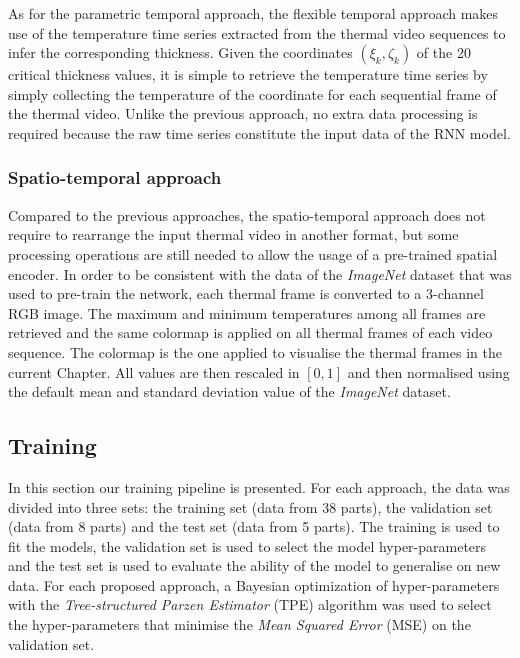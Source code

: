 As for the parametric temporal approach, the flexible temporal approach makes use of the temperature time series extracted from the thermal video sequences to infer the corresponding thickness. Given the coordinates $(\xi_{k}, \zeta_{k})$ of the 20 critical thickness values, it is simple to retrieve the temperature time series by simply collecting the temperature of the coordinate for each sequential frame of the thermal video. Unlike the previous approach, no extra data processing is required because the raw time series constitute the input data of the RNN model. 

\subsubsection{Spatio-temporal approach}
Compared to the previous approaches, the spatio-temporal approach does not require to rearrange the input thermal video in another format, but some processing operations are still needed to allow the usage of a pre-trained spatial encoder. In order to be consistent with the data of the \textit{ImageNet} dataset \citep{deng2009imagenet} that was used  to pre-train the network, each thermal frame is converted to a 3-channel RGB image. The maximum and minimum temperatures among all frames are retrieved and the same colormap is applied on all thermal frames of each video sequence. The colormap is the one applied to visualise the thermal frames in the current Chapter. All values are then rescaled in $[0, 1]$ and then normalised using the default mean and standard deviation value of the \textit{ImageNet} dataset.

\subsection{Training}

In this section our training pipeline is presented. For each approach, the data was divided into three sets: the training set (data from 38 parts), the validation set (data from 8 parts) and the test set (data from 5 parts). The training is used to fit the models, the validation set is used to select the model hyper-parameters and the test set is used to evaluate the ability of the model to generalise on new data. For each proposed approach, a Bayesian optimization of hyper-parameters with the \textit{Tree-structured Parzen Estimator} (TPE) \citep{bergstra2011algorithms} algorithm was used to select the hyper-parameters that minimise the \textit{Mean Squared Error} (MSE) on the validation set.

